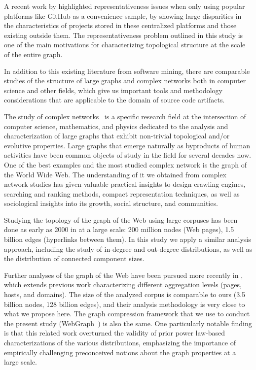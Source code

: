 A recent work by \textcite{trujillo2021penumbra} highlighted
representativeness issues when only using popular platforms like GitHub as a
convenience sample, by showing large disparities in the characteristics of
projects stored in these centralized platforms and those existing outside them.
The representativeness problem outlined in this study is one of the main
motivations for characterizing topological structure at the scale of the entire
graph.

In addition to this existing literature from software mining, there are
comparable studies of the structure of large graphs and complex networks both
in computer science and other fields, which give us important tools and
methodology considerations that are applicable to the domain of source code
artifacts.

The study of complex networks~\cite{barabasi2002networkstats,
  barabasi2003scalefree} is a specific research field at the intersection of
computer science, mathematics, and physics dedicated to the analysis and
characterization of large graphs that exhibit non-trivial topological and/or
evolutive properties. Large graphs that emerge naturally as byproducts of human
activities have been common objects of study in the field for several decades
now.
One of the best examples and the most studied complex network is the graph of
the World Wide Web. The understanding of it we obtained from complex network
studies has given valuable practical insights to design crawling engines,
searching and ranking methods, compact representation techniques, as well as
sociological insights into its growth, social structure, and communities.

Studying the topology of the graph of the Web using large corpuses has been
done as early as 2000 in \textcite{broder2000graph} at a large scale: 200
million nodes (Web pages), 1.5 billion edges (hyperlinks between them). In this
study we apply a similar analysis approach, including the study of in-degree
and out-degree distributions, as well as the distribution of connected
component sizes.

Further analyses of the graph of the Web have been pursued more recently
in \textcite{vigna2015webstruct}, which extends previous work characterizing
different aggregation levels (pages, hosts, and domains). The size of the
analyzed corpus is comparable to ours (3.5 billion nodes, 128 billion edges),
and their analysis methodology is very close to what we propose here. The graph
compression framework that we use to conduct the present study
(WebGraph~\cite{boldi-vigna-webgraph-1, boldi-vigna-webgraph-2}) is also the
same. One particularly notable finding is that this related work overturned the
validity of prior power law-based characterizations of the various
distributions, emphasizing the importance of empirically challenging
preconceived notions about the graph properties at a large scale.

